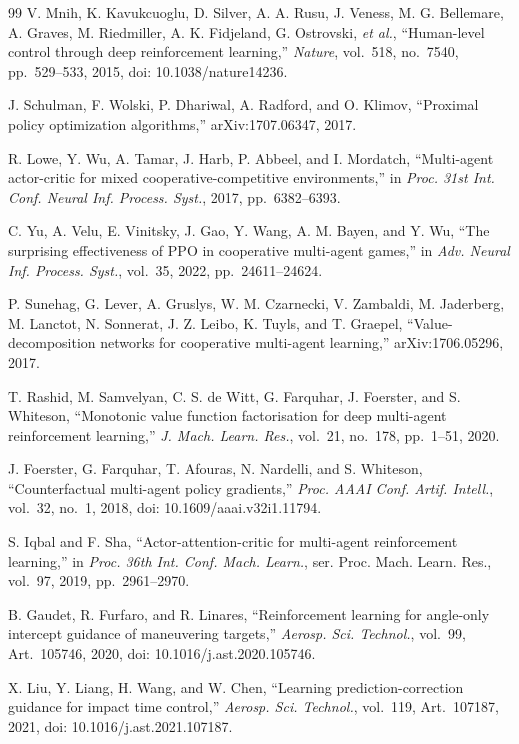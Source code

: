 \begin{thebibliography}{99}
V. Mnih, K. Kavukcuoglu, D. Silver, A. A. Rusu, J. Veness, M. G. Bellemare, A. Graves, M. Riedmiller, A. K. Fidjeland, G. Ostrovski, \textit{et al.}, ``Human-level control through deep reinforcement learning,'' \textit{Nature}, vol.~518, no.~7540, pp.~529--533, 2015, doi: 10.1038/nature14236.

J. Schulman, F. Wolski, P. Dhariwal, A. Radford, and O. Klimov, ``Proximal policy optimization algorithms,'' arXiv:1707.06347, 2017.

R. Lowe, Y. Wu, A. Tamar, J. Harb, P. Abbeel, and I. Mordatch, ``Multi-agent actor-critic for mixed cooperative-competitive environments,'' in \textit{Proc. 31st Int. Conf. Neural Inf. Process. Syst.}, 2017, pp.~6382--6393.

C. Yu, A. Velu, E. Vinitsky, J. Gao, Y. Wang, A. M. Bayen, and Y. Wu, ``The surprising effectiveness of PPO in cooperative multi-agent games,'' in \textit{Adv. Neural Inf. Process. Syst.}, vol.~35, 2022, pp.~24611--24624.

P. Sunehag, G. Lever, A. Gruslys, W. M. Czarnecki, V. Zambaldi, M. Jaderberg, M. Lanctot, N. Sonnerat, J. Z. Leibo, K. Tuyls, and T. Graepel, ``Value-decomposition networks for cooperative multi-agent learning,'' arXiv:1706.05296, 2017.

T. Rashid, M. Samvelyan, C. S. de Witt, G. Farquhar, J. Foerster, and S. Whiteson, ``Monotonic value function factorisation for deep multi-agent reinforcement learning,'' \textit{J. Mach. Learn. Res.}, vol.~21, no.~178, pp.~1--51, 2020.

J. Foerster, G. Farquhar, T. Afouras, N. Nardelli, and S. Whiteson, ``Counterfactual multi-agent policy gradients,'' \textit{Proc. AAAI Conf. Artif. Intell.}, vol.~32, no.~1, 2018, doi: 10.1609/aaai.v32i1.11794.

S. Iqbal and F. Sha, ``Actor-attention-critic for multi-agent reinforcement learning,'' in \textit{Proc. 36th Int. Conf. Mach. Learn.}, ser. Proc. Mach. Learn. Res., vol.~97, 2019, pp.~2961--2970.

B. Gaudet, R. Furfaro, and R. Linares, ``Reinforcement learning for angle-only intercept guidance of maneuvering targets,'' \textit{Aerosp. Sci. Technol.}, vol.~99, Art.~105746, 2020, doi: 10.1016/j.ast.2020.105746.

X. Liu, Y. Liang, H. Wang, and W. Chen, ``Learning prediction-correction guidance for impact time control,'' \textit{Aerosp. Sci. Technol.}, vol.~119, Art.~107187, 2021, doi: 10.1016/j.ast.2021.107187.


\end{thebibliography}
